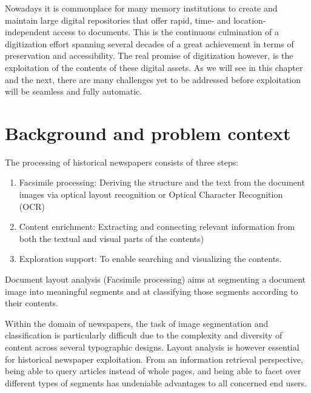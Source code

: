 \documentclass[english, bibtex]{kththesis}
\begin{document}
Nowadays it is commonplace for many memory institutions to create and maintain large digital repositories that offer rapid, time- and location-independent access to documents. This is the continuous culmination of a digitization effort spanning several decades of a great achievement in terms of preservation and accessibility. The real promise of digitization however, is the exploitation of the contents of these digital assets\cite{jdmdh:7097}. As we will see in this chapter and the next, there are many challenges yet to be addressed before exploitation will be seamless and fully automatic. 

\section{Background and problem context}
\label{sec:background}

The processing of historical newspapers consists of three steps: 
\begin{enumerate}
\item Facsimile processing: Deriving the structure and the text from the document images via optical layout recognition or Optical Character Recognition (\gls{OCR})
\item Content enrichment: Extracting and connecting relevant information from both the textual and visual parts of the contents)
\item Exploration support: To enable searching and visualizing the contents.  
\end{enumerate}

Document layout analysis (Facsimile processing) aims at segmenting a document image into meaningful segments and at classifying those segments according to their contents. \cite{ESKENAZI20171} 
    
Within the domain of newspapers, the task of image segmentation and classification is particularly difficult due to the complexity and diversity of content across several typographic designs. Layout analysis is however essential for historical newspaper exploitation. From an information retrieval perspective, being able to query articles instead of whole pages, and being able to facet over different types of segments has undeniable advantages to all concerned end users. 

\end{document}
